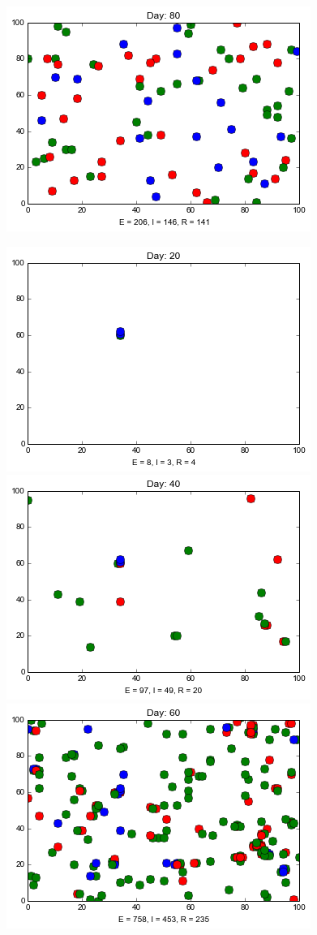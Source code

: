 \begin{figure}[h]
\includegraphics[scale=0.28]{images/2t80.png} 


\medskip
\includegraphics[scale=0.28]{images/4t20.png} \quad
\includegraphics[scale=0.28]{images/4t40.png} \quad
\includegraphics[scale=0.28]{images/4t60.png} \quad

\end{figure}
